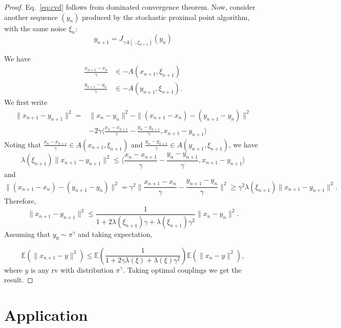 \documentclass{article}
\newcommand{\1}{\mathbbm 1}
\newcommand{\bE}{{{\mathbb E}}}
\newcommand{\ps}[1]{\langle #1 \rangle}
\theoremstyle{definition}
\begin{document}
\begin{proof}
Eq.~\eqref{eq:cvd} follows from dominated convergence theorem.
Now, consider another sequence $(y_n)$ produced by the stochastic proximal point algorithm, with the same noise $\xi_n$:
\begin{equation}
    y_{n+1} = J_{\gamma A(\cdot,\xi_{n+1})}(y_n)
\end{equation}

We have 
\begin{align}
    \frac{x_{n+1} - x_n}{\gamma} &\in - A(x_{n+1},\xi_{n+1}) \label{eq:x}\\
    \frac{y_{n+1} - y_n}{\gamma} &\in - A(y_{n+1},\xi_{n+1}) \label{eq:y}.
\end{align}
We first write
\begin{align}
    \|x_{n+1} - y_{n+1}\|^2 = &\|x_{n} - y_n\|^2 - \|(x_{n+1} - x_n) - (y_{n+1} - y_n)\|^2 \label{eq:square}\\
    &-2\gamma\ps{\frac{x_n - x_{n+1}}{\gamma} - \frac{y_n - y_{n+1}}{\gamma}, x_{n+1} - y_{n+1}}
\label{eq:inner}
\end{align}
Noting that $\frac{x_n - x_{n+1}}{\gamma} \in A(x_{n+1},\xi_{n+1})$ and $\frac{y_n - y_{n+1}}{\gamma} \in A(y_{n+1},\xi_{n+1})$, we have
\begin{equation}
    \lambda(\xi_{n+1})\|x_{n+1} - y_{n+1}\|^2 \leq \ps{\frac{x_n - x_{n+1}}{\gamma} - \frac{y_n - y_{n+1}}{\gamma}, x_{n+1} - y_{n+1}}
\end{equation}
and
\begin{equation}
    \|(x_{n+1} - x_n) - (y_{n+1} - y_n)\|^2 = \gamma^2\|\frac{x_{n+1} - x_n}{\gamma} - \frac{y_{n+1} - y_n}{\gamma}\|^2 \geq \gamma^2\lambda(\xi_{n+1})\|x_{n+1} - y_{n+1}\|^2.
\end{equation}
Therefore, 
\begin{equation}
    \|x_{n+1} - y_{n+1}\|^2 \leq \frac{1}{1+2\lambda(\xi_{n+1})\gamma + \lambda(\xi_{n+1})\gamma^2}\|x_{n} - y_{n}\|^2.
\end{equation}
Assuming that $y_0 \sim \pi^\gamma$ and taking expectation,

\begin{equation}
    \bE(\|x_{n+1} - y\|^2) \leq \bE\left(\frac{1}{1+2\gamma\lambda(\xi) + \lambda(\xi)\gamma^2}\right) \bE(\|x_{n} - y\|^2),
\end{equation}
where $y$ is any rv with distribution $\pi^\gamma$.
Taking optimal couplings we get the result.
\end{proof}
\section{Application}
\end{document}
